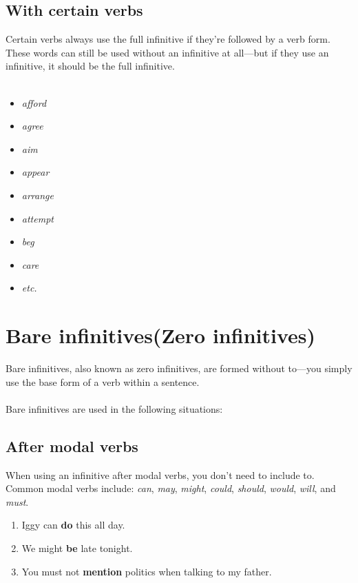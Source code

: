 \subsection{With certain verbs}
Certain verbs always use the full infinitive if they’re followed by a verb form. 
These words can still be used without an infinitive at all—but if they use an infinitive, 
it should be the full infinitive. \\\\
\begin{itemize}
    \item \textit{afford}
    \item \textit{agree}
    \item \textit{aim}
    \item \textit{appear}
    \item \textit{arrange}
    \item \textit{attempt}
    \item \textit{beg}
    \item \textit{care}
    \item \textit{etc.}
\end{itemize}






\section{Bare infinitives(Zero infinitives)}
Bare infinitives, also known as zero infinitives, 
are formed without to—you simply use the base form of a verb within a sentence.\\\\
Bare infinitives are used in the following situations:


\subsection{After modal verbs}
When using an infinitive after modal verbs, you don’t need to include to. 
Common modal verbs include: \textit{can}, \textit{may}, \textit{might}, \textit{could}, 
\textit{should}, \textit{would}, \textit{will}, and \textit{must}.
\begin{enumerate}
    \item[] Iggy can \textbf{do} this all day. 
    \item[] We might \textbf{be} late tonight. 
    \item[] You must not \textbf{mention} politics when talking to my father. 
\end{enumerate}





